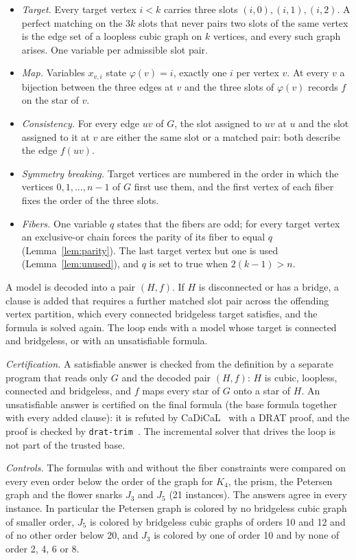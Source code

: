 \documentclass[11pt]{article}
\theoremstyle{definition}
\theoremstyle{remark}
\begin{document}
\begin{itemize}
\item \emph{Target.} Every target vertex $i < k$ carries three slots $(i, 0), (i, 1), (i, 2)$. A
perfect matching on the $3k$ slots that never pairs two slots of the same vertex is the edge set of
a loopless cubic graph on $k$ vertices, and every such graph arises. One variable per admissible
slot pair.
\item \emph{Map.} Variables $x_{v,i}$ state $\varphi(v) = i$, exactly one $i$ per vertex $v$. At
every $v$ a bijection between the three edges at $v$ and the three slots of $\varphi(v)$ records
$f$ on the star of $v$.
\item \emph{Consistency.} For every edge $uv$ of $G$, the slot assigned to $uv$ at $u$ and the slot
assigned to it at $v$ are either the same slot or a matched pair: both describe the edge $f(uv)$.
\item \emph{Symmetry breaking.} Target vertices are numbered in the order in which the vertices
$0, 1, \dots, n-1$ of $G$ first use them, and the first vertex of each fiber fixes the order of the
three slots.
\item \emph{Fibers.} One variable $q$ states that the fibers are odd; for every target vertex an
exclusive-or chain forces the parity of its fiber to equal $q$ (Lemma~\ref{lem:parity}). The last
target vertex but one is used (Lemma~\ref{lem:unused}), and $q$ is set to true when
$2(k - 1) > n$.
\end{itemize}

A model is decoded into a pair $(H, f)$. If $H$ is disconnected or has a bridge, a clause is added
that requires a further matched slot pair across the offending vertex partition, which every
connected bridgeless target satisfies, and the formula is solved again. The loop ends with a model
whose target is connected and bridgeless, or with an unsatisfiable formula.

\emph{Certification.} A satisfiable answer is checked from the definition by a separate program
that reads only $G$ and the decoded pair $(H, f)$: $H$ is cubic, loopless, connected and
bridgeless, and $f$ maps every star of $G$ onto a star of $H$. An unsatisfiable answer is
certified on the final formula (the base formula together with every added clause): it is refuted
by CaDiCaL~\cite{CaDiCaL} with a DRAT proof, and the proof is checked by
\texttt{drat-trim}~\cite{DRATtrim}. The incremental solver that drives the loop is not part of the
trusted base.

\emph{Controls.} The formulas with and without the fiber constraints were compared on every even
order below the order of the graph for $K_4$, the prism, the Petersen graph and the flower snarks
$J_3$ and $J_5$ (21 instances). The answers agree in every instance. In particular the Petersen
graph is colored by no bridgeless cubic graph of smaller order, $J_5$ is colored by bridgeless
cubic graphs of orders 10 and 12 and of no other order below 20, and $J_3$ is colored by one of
order 10 and by none of order 2, 4, 6 or 8.
\end{document}

